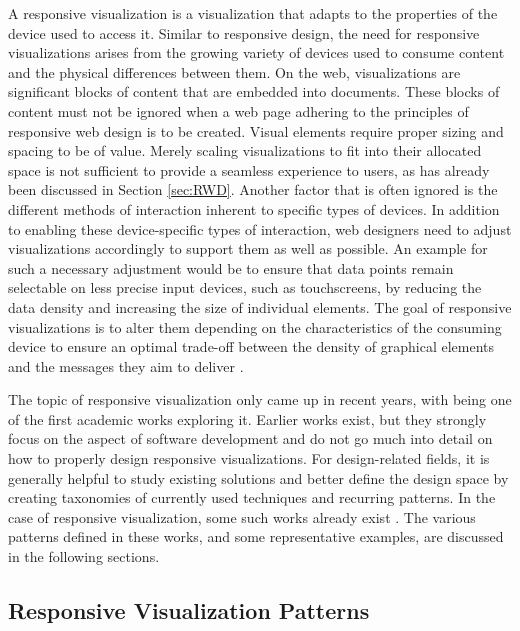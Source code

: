 A responsive visualization is a visualization that adapts to the properties of the device used to access it. Similar to responsive design, the need for responsive visualizations arises from the growing variety of devices used to consume content and the physical differences between them. On the web, visualizations are significant blocks of content that are embedded into documents. These blocks of content must not be ignored when a web page adhering to the principles of responsive web design is to be created. Visual elements require proper sizing and spacing to be of value. Merely scaling visualizations to fit into their allocated space is not sufficient to provide a seamless experience to users, as has already been discussed in Section \ref{sec:RWD}. Another factor that is often ignored is the different methods of interaction inherent to specific types of devices. In addition to enabling these device-specific types of interaction, web designers need to adjust visualizations accordingly to support them as well as possible. An example for such a necessary adjustment would be to ensure that data points remain selectable on less precise input devices, such as touchscreens, by reducing the data density and increasing the size of individual elements. The goal of responsive visualizations is to alter them depending on the characteristics of the consuming device to ensure an optimal trade-off between the density of graphical elements and the messages they aim to deliver \parencite{DesignPatternsTradeOffsRespVis}. 

The topic of responsive visualization only came up in recent years, with \cite{RespVis} being one of the first academic works exploring it. Earlier works \parencite{BuildingRespDataVisForTheWeb,LearningRespDataVis} exist, but they strongly focus on the aspect of software development and do not go much into detail on how to properly design responsive visualizations.  For design-related fields, it is generally helpful to study existing solutions and better define the design space by creating taxonomies of currently used techniques and recurring patterns.  In the case of responsive visualization, some such works already exist \parencite{TechniquesForFlexibleRespVisDesign,DesignPatternsTradeOffsRespVis,RespVisSurvey}. The various patterns defined in these works, and some representative examples, are discussed in the following sections.

\subsection{Responsive Visualization Patterns}

